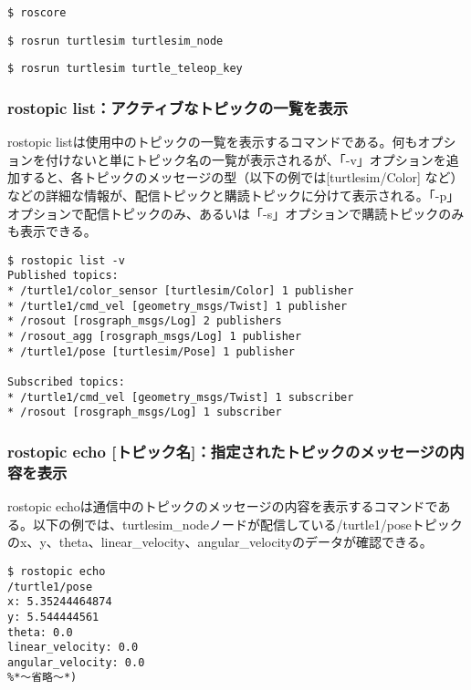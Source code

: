 \begin{lstlisting}[language=ROS]
$ roscore
\end{lstlisting}

\begin{lstlisting}[language=ROS]
$ rosrun turtlesim turtlesim_node
\end{lstlisting}

\begin{lstlisting}[language=ROS]
$ rosrun turtlesim turtle_teleop_key
\end{lstlisting}

\subsubsection{rostopic list：アクティブなトピックの一覧を表示}

rostopic listは使用中のトピックの一覧を表示するコマンドである。何もオプションを付けないと単にトピック名の一覧が表示されるが、「-v」オプションを追加すると、各トピックのメッセージの型（以下の例では[turtlesim/Color] など）などの詳細な情報が、配信トピックと購読トピックに分けて表示される。「-p」オプションで配信トピックのみ、あるいは「-s」オプションで購読トピックのみも表示できる。

\begin{lstlisting}[language=ROS]
$ rostopic list -v
Published topics:
* /turtle1/color_sensor [turtlesim/Color] 1 publisher
* /turtle1/cmd_vel [geometry_msgs/Twist] 1 publisher
* /rosout [rosgraph_msgs/Log] 2 publishers
* /rosout_agg [rosgraph_msgs/Log] 1 publisher
* /turtle1/pose [turtlesim/Pose] 1 publisher

Subscribed topics:
* /turtle1/cmd_vel [geometry_msgs/Twist] 1 subscriber
* /rosout [rosgraph_msgs/Log] 1 subscriber
\end{lstlisting}

\subsubsection{rostopic echo [トピック名]：指定されたトピックのメッセージの内容を表示}

rostopic echoは通信中のトピックのメッセージの内容を表示するコマンドである。以下の例では、turtlesim\_nodeノードが配信している/turtle1/poseトピックのx、y、theta、linear\_velocity、angular\_velocityのデータが確認できる。

\begin{lstlisting}[language=ROS]
$ rostopic echo
/turtle1/pose
x: 5.35244464874
y: 5.544444561
theta: 0.0
linear_velocity: 0.0
angular_velocity: 0.0
%*〜省略〜*)
\end{lstlisting}

